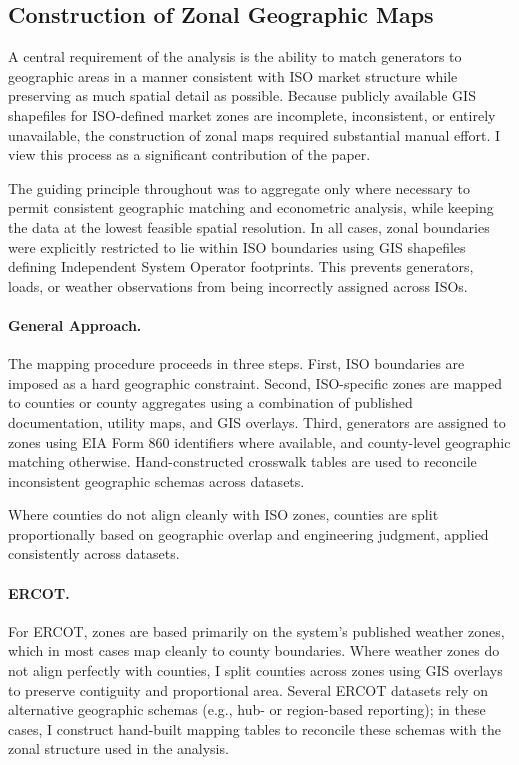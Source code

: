 \documentclass[a4paper,fleqn,longmktitle]{cas-sc}
\begin{document}
\subsection{Construction of Zonal Geographic Maps}\label{zonalMappingEfforts}


A central requirement of the analysis is the ability to match generators to geographic areas in a manner consistent with ISO market structure while preserving as much spatial detail as possible. Because publicly available GIS shapefiles for ISO-defined market zones are incomplete, inconsistent, or entirely unavailable, the construction of zonal maps required substantial manual effort. I view this process as a significant contribution of the paper.

The guiding principle throughout was to aggregate only where necessary to permit consistent geographic matching and econometric analysis, while keeping the data at the lowest feasible spatial resolution. In all cases, zonal boundaries were explicitly restricted to lie within ISO boundaries using GIS shapefiles defining Independent System Operator footprints. This prevents generators, loads, or weather observations from being incorrectly assigned across ISOs.

\paragraph{General Approach.}
The mapping procedure proceeds in three steps. First, ISO boundaries are imposed as a hard geographic constraint. Second, ISO-specific zones are mapped to counties or county aggregates using a combination of published documentation, utility maps, and GIS overlays. Third, generators are assigned to zones using EIA Form 860 identifiers where available, and county-level geographic matching otherwise. Hand-constructed crosswalk tables are used to reconcile inconsistent geographic schemas across datasets.

Where counties do not align cleanly with ISO zones, counties are split proportionally based on geographic overlap and engineering judgment, applied consistently across datasets.

\paragraph{ERCOT.}
For ERCOT, zones are based primarily on the system’s published weather zones, which in most cases map cleanly to county boundaries. Where weather zones do not align perfectly with counties, I split counties across zones using GIS overlays to preserve contiguity and proportional area. Several ERCOT datasets rely on alternative geographic schemas (e.g., hub- or region-based reporting); in these cases, I construct hand-built mapping tables to reconcile these schemas with the zonal structure used in the analysis.
\end{document}
